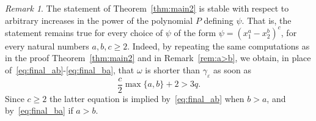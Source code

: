 \documentclass[12pt]{amsart}
\theoremstyle{plain}
\theoremstyle{definition}
\theoremstyle{remark}
\newtheorem{remark}[theorem]{Remark}
\numberwithin{equation}{section}
\newcommand{\<}{\langle}
\renewcommand{\>}{\rangle}
\newcommand{\e}{\varepsilon}
\newcommand{\0}{\theta}
\newcommand{\w}{\omega}
\newcommand{\g}{\gamma}
\newcommand{\1}{{-1}}
\renewcommand{\=}{\coloneqq}
\renewcommand{\.}{\dots}
\renewcommand{\-}{\cdot}
\renewcommand{\:}{\,:\,}
\theoremstyle{definition}
\begin{document}
\begin{remark}
	\label{rem:add_c}	
	The statement of Theorem~\ref{thm:main2} is stable with respect to arbitrary increases in the power of the polynomial $P$ defining $\psi$. That is, the statement remains true for every choice of $\psi$ of the form $\psi=(x_1^a-x_2^b)^c$, for every natural numbers $a,b,c\geq2$. Indeed, by repeating the same computations as in the proof Theorem~\ref{thm:main2} and in Remark~\ref{rem:a>b}, we obtain, in place of~\eqref{eq:final_ab}-\eqref{eq:final_ba}, that $\w$ is shorter than $\g_\e$ as soon as
	\begin{equation}
		\label{eq:final_abc}
		\frac c2\max\{a,b\}+2 > 3q.
	\end{equation}
	Since $c\geq2$ the latter equation is implied by~\eqref{eq:final_ab} when $b>a$, and by~\eqref{eq:final_ba} if $a>b$.
\end{remark}















\end{document}
